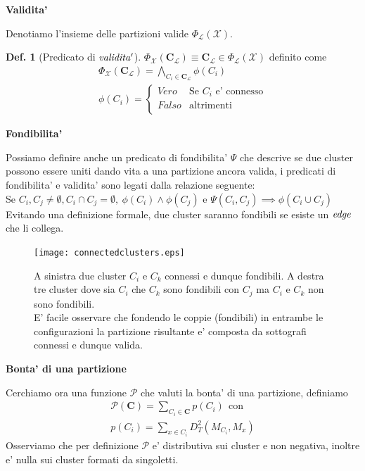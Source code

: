 \documentclass{seminar}
\theoremstyle{definition}
\newtheorem{definition}{Def.}
\def\bc{\begin{center}}
\def\ec{\end{center}}
\def\bs{\begin{slide}\begingroup\small}
\def\es{\endgroup\end{slide}}
\begin{document}
\bs
\bc{\bf\color{blue}Validita'}\ec
Denotiamo l'insieme delle partizioni valide $\Phi_\mathcal{L}(\mathcal{X})$.
\begin{definition}[Predicato di $\it{validita'}$]
$\Phi_\mathcal{X}(\textbf{C}_\mathcal{L}) \equiv \textbf{C}_\mathcal{L}\in \Phi_\mathcal{L}(\mathcal{X})$ definito come
\begin{equation*}
\begin{gathered}
\Phi_\mathcal{X}(\textbf{C}_\mathcal{L}) = \bigwedge_{C_i\in\textbf{C}_\mathcal{L}}\phi(C_i) \\
\phi(C_i) = 
  \begin{cases}
                                   Vero & \text{Se $C_i$ e' connesso} \\
                                   Falso & \text{altrimenti} \\
  \end{cases}
\end{gathered}
\end{equation*}
\end{definition}
\bc{\bf\color{blue}Fondibilita'}\ec
Possiamo definire anche un predicato di fondibilita' $\Psi$ che descrive se due cluster possono essere uniti dando vita a una partizione ancora valida, i predicati di fondibilita' e validita' sono legati dalla relazione seguente: \\
Se $C_i,C_j\neq \emptyset, C_i\cap C_j =\emptyset, \ \phi(C_i)\wedge\phi(C_j)$ e $\Psi(C_i, C_j) \implies \phi(C_i\cup C_j)$
Evitando una definizione formale, due cluster saranno fondibili se esiste un $\it{edge}$ che li collega.
\es

\bs
\begin{figure}[t]
\centering
\texttt{[image: connectedclusters.eps]}
\caption{A sinistra due cluster $C_i$ e $C_k$ connessi e dunque fondibili. A destra tre cluster dove sia $C_i$ che $C_k$ sono fondibili con $C_j$ ma $C_i$ e $C_k$ non sono fondibili. \\
E' facile osservare che fondendo le coppie (fondibili) in entrambe le configurazioni la partizione risultante e' composta da sottografi connessi e dunque valida.}
\end{figure}
\es

\bs
\bc{\bf\color{blue}Bonta' di una partizione}\ec
Cerchiamo ora una funzione $\mathcal{P}$ che valuti la bonta' di una partizione, definiamo
\begin{equation*}
\begin{gathered}
	\mathcal{P}(\textbf{C}) = \sum_{C_i\in\textbf{C}}p(C_i) \ \ \text{con} \\
	p(C_i) = \sum_{x\in C_i}D^{2}_T(M_{C_i}, M_x)
\end{gathered}
\end{equation*}
Osserviamo che per definizione $\mathcal{P}$ e' distributiva sui cluster e non negativa, inoltre e' nulla sui cluster formati da singoletti.
\es
\end{document}
